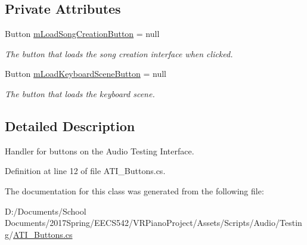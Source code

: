 \subsection*{Private Attributes}
\begin{DoxyCompactItemize}
\item 
Button \hyperlink{group___a_t_i_buttons_priv_var_ga8ab732143834bd94387cfd94c59886da}{m\+Load\+Song\+Creation\+Button} = null
\begin{DoxyCompactList}\small\item\em The button that loads the song creation interface when clicked. \end{DoxyCompactList}\item 
Button \hyperlink{group___a_t_i_buttons_priv_var_ga7b2f643a87f99b6a35a2d64330c8a9d4}{m\+Load\+Keyboard\+Scene\+Button} = null
\begin{DoxyCompactList}\small\item\em The button that loads the keyboard scene. \end{DoxyCompactList}\end{DoxyCompactItemize}


\subsection{Detailed Description}
Handler for buttons on the Audio Testing Interface. 

Definition at line 12 of file A\+T\+I\+\_\+\+Buttons.\+cs.



The documentation for this class was generated from the following file\+:\begin{DoxyCompactItemize}
\item 
D\+:/\+Documents/\+School Documents/2017\+Spring/\+E\+E\+C\+S542/\+V\+R\+Piano\+Project/\+Assets/\+Scripts/\+Audio/\+Testing/\hyperlink{_a_t_i___buttons_8cs}{A\+T\+I\+\_\+\+Buttons.\+cs}\end{DoxyCompactItemize}
